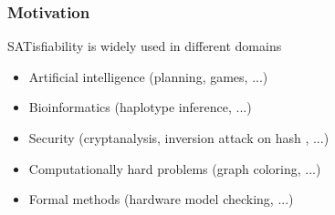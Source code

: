\documentclass{beamer}
\begin{document}
\begin{frame}

\frametitle{Motivation}
SATisfiability is widely used in different domains

\begin{itemize}
	\item Artificial intelligence (planning, games, ...)
	\item Bioinformatics (haplotype inference, ...)
	\item Security (cryptanalysis, inversion attack on hash , ...)
	\item Computationally hard problems (graph coloring, ...)
	\item Formal methods (hardware model checking, ...)
\end{itemize}

\end{frame}
\end{document}
